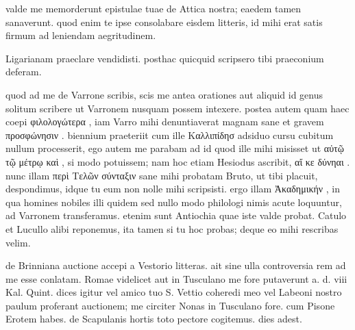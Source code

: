 


 valde me memorderunt epistulae tuae de Attica nostra; eaedem tamen sanaverunt. quod enim te ipse consolabare eisdem litteris, id mihi erat satis firmum ad leniendam aegritudinem.

 Ligarianam praeclare vendidisti. posthac quicquid scripsero tibi praeconium deferam.

 quod ad me de Varrone scribis, scis me antea orationes aut aliquid id genus solitum scribere ut Varronem nusquam possem intexere. postea autem quam haec coepi φιλολογώτερα , iam Varro mihi denuntiaverat magnam sane et gravem προσφώνησιν . biennium praeteriit cum ille Καλλιπίδησ adsiduo cursu cubitum nullum processerit, ego autem me parabam ad id quod ille mihi misisset ut αὐτῷ τῷ μέτρῳ καὶ , si modo potuissem; nam hoc etiam Hesiodus ascribit, αἴ κε δύνηαι . nunc illam περὶ Τελῶν σύνταξιν sane mihi probatam Bruto, ut tibi placuit, despondimus, idque tu eum non nolle mihi scripsisti. ergo illam Ἀκαδημικήν , in qua homines nobiles illi quidem sed nullo modo philologi nimis acute loquuntur, ad Varronem transferamus. etenim sunt Antiochia quae iste valde probat. Catulo et Lucullo alibi reponemus, ita tamen si tu hoc probas; deque eo mihi rescribas velim.

 de Brinniana auctione accepi a Vestorio litteras. ait sine ulla controversia rem ad me esse conlatam. Romae videlicet aut in Tusculano me fore putaverunt a. d. viii Kal. Quint. dices igitur vel amico tuo S. Vettio coheredi meo vel Labeoni nostro paulum proferant auctionem; me circiter Nonas in Tusculano fore. cum Pisone Erotem habes. de Scapulanis hortis toto pectore cogitemus. dies adest.
